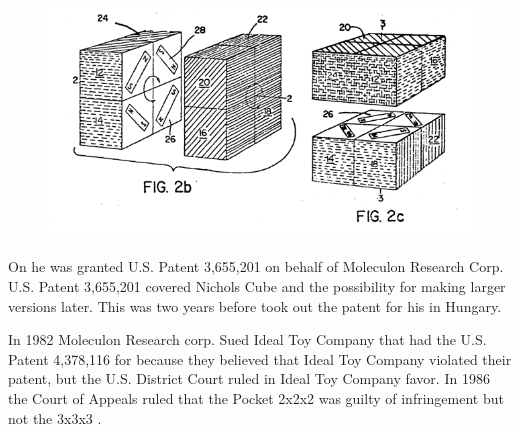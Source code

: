 \begin{figure}[hb]
	\centering
		\includegraphics[scale=0.8]{input/pics/Nicholspatent2.png}
	\caption{}
	\label{fig:Nicholspatent2}
\end{figure}

On  he was granted U.S. Patent 3,655,201 on behalf of Moleculon Research Corp. U.S. Patent 3,655,201 covered Nichols Cube and the possibility for making larger versions later. This was two years before \erno{} took out the patent for his \rubik{} in Hungary. 

In 1982 Moleculon Research corp.  Sued Ideal Toy Company that had the U.S. Patent 4,378,116 for \rubik{} because they believed that Ideal Toy Company violated their patent, but the U.S. District Court ruled in Ideal Toy Company favor. In 1986 the Court of Appeals ruled that the Pocket \rubik{} 2x2x2 was guilty of infringement but not the 3x3x3 \rubik{}.

%